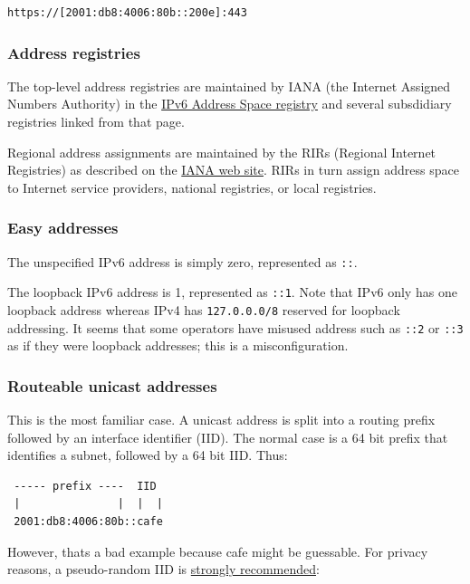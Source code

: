 \documentclass[
]{article}
\begin{document}
\begin{verbatim}
https://[2001:db8:4006:80b::200e]:443
\end{verbatim}

\subsubsection{Address registries}\label{address-registries}

The top-level address registries are maintained by IANA (the Internet
Assigned Numbers Authority) in the
\href{https://www.iana.org/assignments/ipv6-address-space/ipv6-address-space.xhtml}{IPv6
Address Space registry} and several subsdidiary registries linked from
that page.

Regional address assignments are maintained by the RIRs (Regional
Internet Registries) as described on the
\href{https://www.iana.org/numbers}{IANA web site}. RIRs in turn assign
address space to Internet service providers, national registries, or
local registries.

\subsubsection{Easy addresses}\label{easy-addresses}

The unspecified IPv6 address is simply zero, represented as \texttt{::}.

The loopback IPv6 address is 1, represented as \texttt{::1}. Note that
IPv6 only has one loopback address whereas IPv4 has \texttt{127.0.0.0/8}
reserved for loopback addressing. It seems that some operators have
misused address such as \texttt{::2} or \texttt{::3} as if they were
loopback addresses; this is a misconfiguration.

\subsubsection{Routeable unicast
addresses}\label{routeable-unicast-addresses}

This is the most familiar case. A unicast address is split into a
routing prefix followed by an interface identifier (IID). The normal
case is a 64 bit prefix that identifies a subnet, followed by a 64 bit
IID. Thus:

\begin{verbatim}
 ----- prefix ----  IID
 |               |  |  |
 2001:db8:4006:80b::cafe
\end{verbatim}

However, that\textquotesingle s a bad example because
\textquotesingle cafe\textquotesingle{} might be guessable. For privacy
reasons, a pseudo-random IID is
\href{https://www.rfc-editor.org/info/rfc8064}{strongly recommended}:
\end{document}
